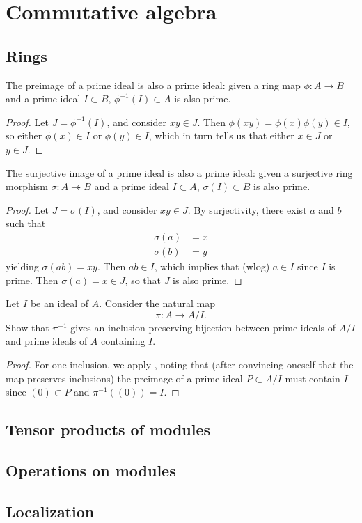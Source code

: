 \chapter{Commutative algebra}

\section{Rings}
\label{sec:rings}

\begin{prop}%
  \label{prop:preimage-of-prime-is-prime}
  The preimage of a prime ideal is also a prime ideal: given a ring map $\phi :
  A \to B$ and a prime ideal $I \subset B$, $\phi^{-1}(I) \subset A$ is also
  prime.
\end{prop}
\begin{proof}
  Let $J = \phi^{-1}(I)$, and consider $xy \in J$. Then $\phi(xy) =
  \phi(x)\phi(y) \in I$, so either $\phi(x) \in I$ or $\phi(y) \in I$, which in
  turn tells us that either $x \in J$ or $y \in J$.
\end{proof}

\begin{prop}%
  \label{prop:surjective-image-of-prime-is-prime}
  The surjective image of a prime ideal is also a prime ideal: given a
  surjective ring morphism $\sigma : A \twoheadrightarrow B$ and a prime ideal
  $I \subset A$, $\sigma(I) \subset B$ is also prime.
\end{prop}
\begin{proof}
  Let $J = \sigma(I)$, and consider $xy \in J$. By surjectivity, there exist $a$
  and $b$ such that
  \begin{align*}
    \sigma(a) &= x\\
    \sigma(b) &= y
  \end{align*}
  yielding $\sigma(ab) = xy$. Then $ab \in I$, which implies that (wlog) $a \in
  I$ since $I$ is prime. Then $\sigma(a) = x \in J$, so that $J$ is also prime.
\end{proof}

\begin{prop}
  Let $I$ be an ideal of $A$. Consider the natural map
  \[\pi : A \to A/I.\]
  Show that $\pi^{-1}$ gives an inclusion-preserving bijection between prime
  ideals of $A/I$ and prime ideals of $A$ containing $I$.
\end{prop}
\begin{proof}
  For one inclusion, we apply , noting
  that (after convincing oneself that the map preserves inclusions) the preimage
  of a prime ideal $P \subset A/I$ must contain $I$ since $(0) \subset P$ and
  $\pi^{-1}((0)) = I$.
\end{proof}

\section{Tensor products of modules}
\label{sec:tensor-products-of-modules}

\section{Operations on modules}
\label{sec:operations-on-modules}

\section{Localization}
\label{sec:localization}